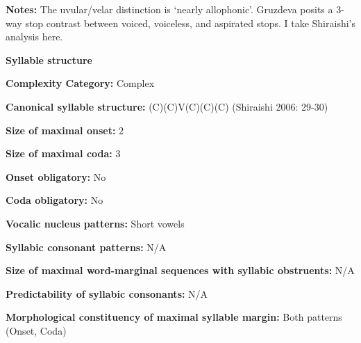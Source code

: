 \begin{styleBody}
\textbf{Notes:} The uvular/velar distinction is ‘nearly allophonic’. Gruzdeva posits a 3-way stop contrast between voiced, voiceless, and aspirated stops. I take Shiraishi’s analysis here.
\end{styleBody}

\begin{styleBody}
\textbf{Syllable structure}
\end{styleBody}

\begin{styleBody}
\textbf{Complexity Category:} Complex
\end{styleBody}

\begin{styleBody}
\textbf{Canonical syllable structure:} (C)(C)V(C)(C)(C)\textbf{ }(Shiraishi 2006: 29-30)
\end{styleBody}

\begin{styleBody}
\textbf{Size of maximal onset:} 2
\end{styleBody}

\begin{styleBody}
\textbf{Size of maximal coda:} 3
\end{styleBody}

\begin{styleBody}
\textbf{Onset obligatory:} No
\end{styleBody}

\begin{styleBody}
\textbf{Coda obligatory:} No
\end{styleBody}

\begin{styleBody}
\textbf{Vocalic nucleus patterns:} Short vowels
\end{styleBody}

\begin{styleBody}
\textbf{Syllabic consonant patterns:} N/A
\end{styleBody}

\begin{styleBody}
\textbf{Size of maximal word{}-marginal sequences with syllabic obstruents:} N/A
\end{styleBody}

\begin{styleBody}
\textbf{Predictability of syllabic consonants:} N/A
\end{styleBody}

\begin{styleBody}
\textbf{Morphological constituency of maximal syllable margin:} Both patterns (Onset, Coda)
\end{styleBody}

